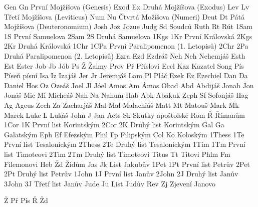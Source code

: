\BookTitle Gen  Gn {První Mojžíšova (Genesis)}
\BookTitle Exod Ex {Druhá Mojžíšova (Exodus)}
\BookTitle Lev  Lv {Třetí Mojžíšova (Leviticus)}
\BookTitle Num  Nu {Čtvrtá Možíšova (Numeri)}
\BookTitle Deut Dt {Pátá Mojžíšova (Deuteronomium)}
\BookTitle Josh Joz {Jozue}
\BookTitle Judg Sd {Soudců}
\BookTitle Ruth Rt {Rút}
\BookTitle 1Sam 1S {První Samuelova}
\BookTitle 2Sam 2S {Druhá Samuelova}
\BookTitle 1Kgs 1Kr {První Královská}
\BookTitle 2Kgs 2Kr {Druhá Královská}
\BookTitle 1Chr 1CPa {První Paralipomenon (1. Letopisů)}
\BookTitle 2Chr 2Pa {Druhá Paralipomenon (2. Letopisů)}
\BookTitle Ezra Ezd {Ezdráš}
\BookTitle Neh  Neh {Nehemjáš}
\BookTitle Esth Est {Ester}
\BookTitle Job  Jb {Jób}
\BookTitle Ps   Ž {Žalmy}
\BookTitle Prov Př {Přísloví}
\BookTitle Eccl Kaz {Kazatel}
\BookTitle Song Pís {Píseň písní}
\BookTitle Isa  Iz {Izajáš}
\BookTitle Jer  Jr {Jeremjáš}
\BookTitle Lam  Pl {Pláč}
\BookTitle Ezek Ez {Ezechiel}
\BookTitle Dan  Da {Daniel}
\BookTitle Hos  Oz {Ozeáš}
\BookTitle Joel Jl {Jóel}
\BookTitle Amos Am {Ámos}
\BookTitle Obad Abd {Abdijáš}
\BookTitle Jonah Jon {Jonáš}
\BookTitle Mic  Mi {Micheáš}
\BookTitle Nah  Na {Nahum}
\BookTitle Hab  Abk {Abakuk}
\BookTitle Zeph Sf {Sofonjáš}
\BookTitle Hag  Ag {Ageus}
\BookTitle Zech Za {Zacharjáš}
\BookTitle Mal  Mal {Malachiáš}
\BookTitle Matt Mt {Matouš}
\BookTitle Mark Mk {Marek}
\BookTitle Luke L {Lukáš}
\BookTitle John J {Jan}
\BookTitle Acts Sk {Skutky apoštolské}
\BookTitle Rom  Ř {Římanům}
\BookTitle 1Cor 1K {První list Korintským}
\BookTitle 2Cor 2K {Druhý list Korintským}
\BookTitle Gal  Ga {Galatským}
\BookTitle Eph  Ef {Efezským}
\BookTitle Phil Fp {Filipským}
\BookTitle Col  Ko {Koloským}
\BookTitle 1Thess 1Te {První list Tesalonickým}
\BookTitle 2Thess 2Te {Druhý list Tesalonickým}
\BookTitle 1Tim 1Tm {První list Timoteovi}
\BookTitle 2Tim 2Tm {Druhý list Timoteovi}
\BookTitle Titus Tt {Titovi}
\BookTitle Phlm  Fm {Filemonovi}
\BookTitle Heb   Žd {Židům}
\BookTitle Jas   Jk {List Jakubův}
\BookTitle 1Pet  1Pt {První list Petrův}
\BookTitle 2Pet  2Pt {Druhý list Petrův}
\BookTitle 1John 1J {První list Janův}
\BookTitle 2John 2J {Druhý list Janův}
\BookTitle 3John 3J {Třetí list Janův}
\BookTitle Jude  Ju {List Judův}
\BookTitle Rev   Zj {Zjevení Janovo}     

\BookException Ž   {\def\amark{Z}}
\BookException Př  {\def\amark{Pr}}
\BookException Pís {\def\amark{Pis}}
\BookException Ř   {\def\amark{R}}
\BookException Žd  {\def\amark{Zd}}

